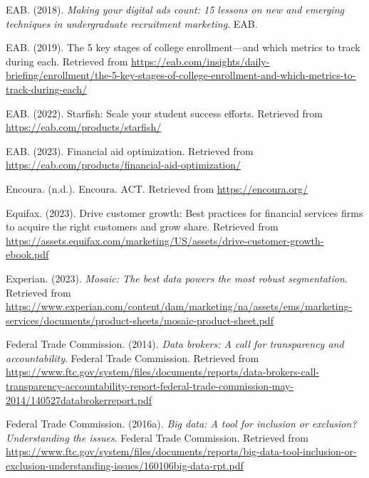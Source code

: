 \documentclass[
  12pt,
]{article}
\newlength{\cslhangindent}
\newlength{\cslentryspacingunit} %
\newenvironment{CSLReferences}[2] %
 {%
  \setlength{\parindent}{0pt}
  \ifodd #1
  \let\oldpar\par
  \def\par{\hangindent=\cslhangindent\oldpar}
  \fi
  \setlength{\parskip}{#2\cslentryspacingunit}
 }%
 {}
\begin{document}
\begin{CSLReferences}{1}{0}
\leavevmode{}%
EAB. (2018). \emph{Making your digital ads count: 15 lessons on new and emerging techniques in undergraduate recruitment marketing}. {EAB}.

\leavevmode{}%
EAB. (2019). The 5 key stages of college enrollment---and which metrics to track during each. Retrieved from \url{https://eab.com/insights/daily-briefing/enrollment/the-5-key-stages-of-college-enrollment-and-which-metrics-to-track-during-each/}

\leavevmode{}%
EAB. (2022). Starfish: Scale your student success efforts. Retrieved from \url{https://eab.com/products/starfish/}

\leavevmode{}%
EAB. (2023). Financial aid optimization. Retrieved from \url{https://eab.com/products/financial-aid-optimization/}

\leavevmode{}%
Encoura. (n.d.). Encoura. ACT. Retrieved from \url{https://encoura.org/}

\leavevmode{}%
Equifax. (2023). Drive customer growth: Best practices for financial services firms to acquire the right customers and grow share. Retrieved from \url{https://assets.equifax.com/marketing/US/assets/drive-customer-growth-ebook.pdf}

\leavevmode{}%
Experian. (2023). \emph{Mosaic: The best data powers the most robust segmentation}. Retrieved from \url{https://www.experian.com/content/dam/marketing/na/assets/ems/marketing-services/documents/product-sheets/mosaic-product-sheet.pdf}

\leavevmode{}%
Federal Trade Commission. (2014). \emph{Data brokers: A call for transparency and accountability}. {Federal Trade Commission}. Retrieved from \url{https://www.ftc.gov/system/files/documents/reports/data-brokers-call-transparency-accountability-report-federal-trade-commission-may-2014/140527databrokerreport.pdf}

\leavevmode{}%
Federal Trade Commission. (2016a). \emph{Big data: A tool for inclusion or exclusion? Understanding the issues}. {Federal Trade Commission}. Retrieved from \url{https://www.ftc.gov/system/files/documents/reports/big-data-tool-inclusion-or-exclusion-understanding-issues/160106big-data-rpt.pdf}


\end{CSLReferences}
\end{document}
